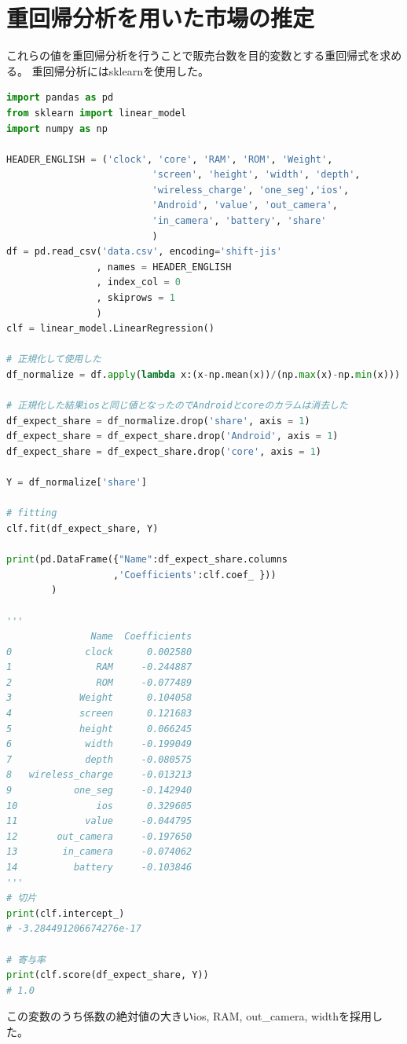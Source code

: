 \documentclass{jarticle}
\begin{document}
\section{重回帰分析を用いた市場の推定}
これらの値を重回帰分析を行うことで販売台数を目的変数とする重回帰式を求める。
重回帰分析にはsklearnを使用した。

\begin{lstlisting}[caption=重回帰分析, frame=single, language=python]
import pandas as pd
from sklearn import linear_model
import numpy as np

HEADER_ENGLISH = ('clock', 'core', 'RAM', 'ROM', 'Weight',
　　　　　　　　　　　　　　　 'screen', 'height', 'width', 'depth',
　　　　　　　　　　　　　　　 'wireless_charge', 'one_seg','ios', 
　　　　　　　　　　　　　　　 'Android', 'value', 'out_camera', 
　　　　　　　　　　　　　　　 'in_camera', 'battery', 'share'
　　　　　　　　　　　　　　　 )
df = pd.read_csv('data.csv', encoding='shift-jis'
                , names = HEADER_ENGLISH
                , index_col = 0
                , skiprows = 1
                )
clf = linear_model.LinearRegression()

# 正規化して使用した
df_normalize = df.apply(lambda x:(x-np.mean(x))/(np.max(x)-np.min(x)))

# 正規化した結果iosと同じ値となったのでAndroidとcoreのカラムは消去した
df_expect_share = df_normalize.drop('share', axis = 1)
df_expect_share = df_expect_share.drop('Android', axis = 1)
df_expect_share = df_expect_share.drop('core', axis = 1)

Y = df_normalize['share']

# fitting
clf.fit(df_expect_share, Y)

print(pd.DataFrame({"Name":df_expect_share.columns
                   ,'Coefficients':clf.coef_ }))
        )

'''
               Name  Coefficients
0             clock      0.002580
1               RAM     -0.244887
2               ROM     -0.077489
3            Weight      0.104058
4            screen      0.121683
5            height      0.066245
6             width     -0.199049
7             depth     -0.080575
8   wireless_charge     -0.013213
9           one_seg     -0.142940
10              ios      0.329605
11            value     -0.044795
12       out_camera     -0.197650
13        in_camera     -0.074062
14          battery     -0.103846
'''
# 切片
print(clf.intercept_)
# -3.284491206674276e-17

# 寄与率
print(clf.score(df_expect_share, Y))
# 1.0
\end{lstlisting}
この変数のうち係数の絶対値の大きいios, RAM, out\_camera, widthを採用した。
\end{document}
